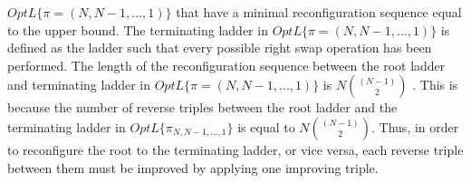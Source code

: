 $OptL\{\pi=(N, N-1, \dots, 1)\}$ that have a minimal reconfiguration sequence equal to 
the upper bound. The terminating ladder in $OptL\{\pi=(N, N-1, \dots, 1)\}$ is defined as the ladder 
such that every possible right swap operation has been performed. The length of the reconfiguration sequence 
between the root ladder and terminating ladder in $OptL\{\pi=(N, N-1, \dots, 1)\}$ is $N{(N-1) \choose 2}$ \cite{A2}. 
This is because the number of reverse triples between the root ladder and the terminating ladder 
in $OptL\{\pi_{N, N-1, \dots, 1}\}$ is equal to $N{(N-1) \choose 2}$. Thus, in 
order to reconfigure the root to the terminating ladder, or vice versa, each 
reverse triple between them must be improved by applying one improving triple.

